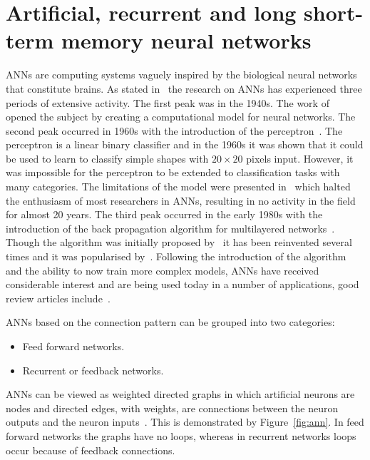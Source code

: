 \section{Artificial, recurrent and long short-term memory neural networks}\label{section:artificial_neural_networks}

ANNs are computing systems vaguely inspired by the biological neural networks
that constitute brains. As stated in~\cite{Jain1996} the research on ANNs
has experienced three periods of extensive activity. The first peak was in the
1940s. The work of~\cite{McCulloch1943} opened the subject by creating a
computational model for neural networks. The second peak occurred in 1960s with
the introduction of the perceptron~\cite{Rosenblatt1958}. The perceptron is a
linear binary classifier and in the 1960s it was shown that it could be used to
learn to classify simple shapes with \(20\times20\) pixels input. However, it
was impossible for the perceptron to be extended to classification tasks with
many categories. The limitations of the model were presented
in~\cite{Minsky1969} which halted the enthusiasm of most researchers in ANNs,
resulting in no activity in the field for almost 20 years. The third peak occurred
in the early 1980s with the introduction of the back propagation algorithm for
multilayered networks~\cite{Werbos1974}. Though the algorithm was initially
proposed by~\cite{Werbos1974} it has been reinvented several times and it was
popularised by~\cite{McClelland1986}. Following the introduction of the
algorithm and the ability to now train more complex models, ANNs have received
considerable interest and are being used today in a number of applications,
good review articles include~\cite{Abiodun2019, Li2010, Mohanraj2015, Shahid2019}.

ANNs based on the connection pattern can be grouped into two categories:

\begin{itemize}
    \item Feed forward networks.
    \item Recurrent or feedback networks.
\end{itemize}

ANNs can be viewed as weighted directed graphs in which artificial neurons are
nodes and directed edges, with weights, are connections between the neuron
outputs and the neuron inputs~\cite{Jain1996}. This is demonstrated by Figure~\ref{fig:ann}.
In feed forward networks the
graphs have no loops, whereas in recurrent networks loops occur because of feedback
connections.

